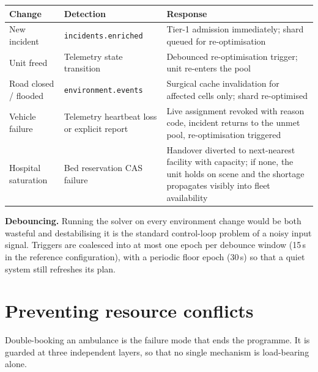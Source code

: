 \begin{center}\footnotesize
\begin{tabular}{@{}lp{46mm}p{52mm}@{}}
\toprule
\textbf{Change} & \textbf{Detection} & \textbf{Response} \\
\midrule
New incident & \texttt{incidents.enriched} & Tier-1 admission immediately; shard queued for re-optimisation \\
Unit freed & Telemetry state transition & Debounced re-optimisation trigger; unit re-enters the pool \\
Road closed / flooded & \texttt{environment.events} & Surgical cache invalidation for affected cells only; shard re-optimised \\
Vehicle failure & Telemetry heartbeat loss or explicit report & Live assignment revoked with reason code, incident returns to the unmet pool, re-optimisation triggered \\
Hospital saturation & Bed reservation CAS failure & Handover diverted to next-nearest facility with capacity; if none, the unit holds on scene and the shortage propagates visibly into fleet availability \\
\bottomrule
\end{tabular}
\end{center}

\begin{keybox}
\textbf{Debouncing.} Running the solver on every environment change would be
both wasteful and destabilising \textemdash{} it is the standard control-loop
problem of a noisy input signal. Triggers are coalesced into at most one epoch
per debounce window (15\,s in the reference configuration), with a periodic
floor epoch (30\,s) so that a quiet system still refreshes its plan.
\end{keybox}

\section{Preventing resource conflicts}
\label{sec:conflict}

Double-booking an ambulance is the failure mode that ends the programme. It is
guarded at three independent layers, so that no single mechanism is
load-bearing alone.

